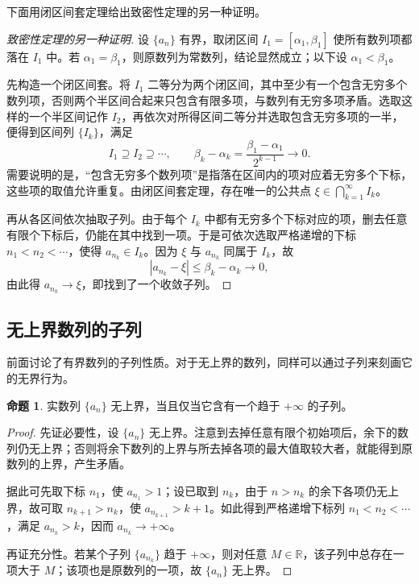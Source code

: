 \documentclass[UTF8, fontset=fandol, a4paper, 12pt]{ctexart}
\newcommand{\R}{\mathbb R}
\theoremstyle{definition}
\newtheorem*{proposition}{命题}
\begin{document}
下面用闭区间套定理给出致密性定理的另一种证明。

\begin{proof}[致密性定理的另一种证明]
设 $\{a_n\}$ 有界，取闭区间 $I_1=[\alpha_1,\beta_1]$ 使所有数列项都落在 $I_1$ 中。若 $\alpha_1=\beta_1$，则原数列为常数列，结论显然成立；以下设 $\alpha_1<\beta_1$。

先构造一个闭区间套。将 $I_1$ 二等分为两个闭区间，其中至少有一个包含无穷多个数列项，否则两个半区间合起来只包含有限多项，与数列有无穷多项矛盾。选取这样的一个半区间记作 $I_2$，再依次对所得区间二等分并选取包含无穷多项的一半，便得到区间列 $\{I_k\}$，满足
\[
I_1\supseteq I_2\supseteq\cdots,\qquad
\beta_k-\alpha_k=\frac{\beta_1-\alpha_1}{2^{k-1}}\longrightarrow0.
\]
需要说明的是，“包含无穷多个数列项”是指落在区间内的项对应着无穷多个下标，这些项的取值允许重复。由闭区间套定理，存在唯一的公共点 $\xi\in\bigcap_{k=1}^{\infty}I_k$。

再从各区间依次抽取子列。由于每个 $I_k$ 中都有无穷多个下标对应的项，删去任意有限个下标后，仍能在其中找到一项。于是可依次选取严格递增的下标 $n_1<n_2<\cdots$，使得 $a_{n_k}\in I_k$。因为 $\xi$ 与 $a_{n_k}$ 同属于 $I_k$，故
\[
|a_{n_k}-\xi|\le\beta_k-\alpha_k\longrightarrow0,
\]
由此得 $a_{n_k}\to\xi$，即找到了一个收敛子列。
\end{proof}

\subsection*{无上界数列的子列}
前面讨论了有界数列的子列性质。对于无上界的数列，同样可以通过子列来刻画它的无界行为。

\begin{proposition}
实数列 $\{a_n\}$ 无上界，当且仅当它含有一个趋于 $+\infty$ 的子列。
\end{proposition}
\begin{proof}
先证必要性，设 $\{a_n\}$ 无上界。注意到去掉任意有限个初始项后，余下的数列仍无上界；否则将余下数列的上界与所去掉各项的最大值取较大者，就能得到原数列的上界，产生矛盾。

据此可先取下标 $n_1$，使 $a_{n_1}>1$；设已取到 $n_k$，由于 $n>n_k$ 的余下各项仍无上界，故可取 $n_{k+1}>n_k$，使 $a_{n_{k+1}}>k+1$。如此得到严格递增下标列 $n_1<n_2<\cdots$，满足 $a_{n_k}>k$，因而 $a_{n_k}\to+\infty$。

再证充分性。若某个子列 $\{a_{n_k}\}$ 趋于 $+\infty$，则对任意 $M\in\R$，该子列中总存在一项大于 $M$；该项也是原数列的一项，故 $\{a_n\}$ 无上界。
\end{proof}
\end{document}
